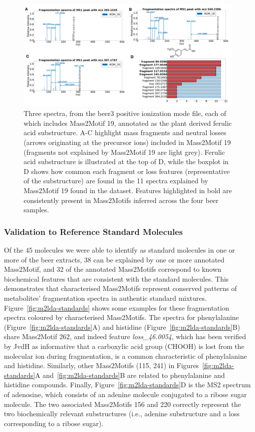 \begin{figure}[!htbp]
\centering\includegraphics[width=0.8\linewidth]{07-lda/figures/figure3.pdf}
\centering\caption[Three spectra, from the beer3 positive ionization mode file, each of which includes Mass2Motif 19, annotated as the plant derived ferulic acid substructure.]{Three spectra, from the beer3 positive ionization mode file, each of which includes Mass2Motif 19, annotated as the plant derived ferulic acid substructure. A-C highlight mass fragments and neutral losses (arrows originating at the precursor ions) included in Mass2Motif 19 (fragments not explained by Mass2Motif 19 are light grey). Ferulic acid substructure is illustrated at the top of D, while the boxplot in D shows how common each fragment or loss features (representative of the substructure) are found in the 11 spectra explained by Mass2Motif 19 found in the dataset. Features highlighted in bold are consistently present in Mass2Motifs inferred across the four beer samples.\label{fig:m2lda-ferulic-acid}}
\end{figure}

\subsubsection{Validation to Reference Standard Molecules}

Of the 45 molecules we were able to identify as standard molecules in one or more of the beer extracts, 38 can be explained by one or more annotated Mass2Motif, and 32 of the annotated Mass2Motifs correspond to known biochemical features that are consistent with the standard molecules. This demonstrates that characterised Mass2Motifs represent conserved patterns of metabolites' fragmentation spectra in authentic standard mixtures. Figure~\ref{fig:m2lda-standards} shows some examples for these fragmentation spectra coloured by characterised Mass2Motifs. The spectra for phenylalanine (Figure~\ref{fig:m2lda-standards}A) and histidine (Figure~\ref{fig:m2lda-standards}B) share Mass2Motif 262, and indeed feature \textit{loss\_46.0054}, which has been verified by JvdH as informative that a carboxylic acid group (CHOOH) is lost from the molecular ion during fragmentation, is a common characteristic of phenylalanine and histidine. Similarly, other Mass2Motifs (115, 241) in Figures~\ref{fig:m2lda-standards}A and~\ref{fig:m2lda-standards}B are related to phenylalanine and histidine compounds. Finally, Figure~\ref{fig:m2lda-standards}D is the MS2 spectrum of adenosine, which consists of an adenine molecule conjugated to a ribose sugar molecule. The two associated Mass2Motifs 156 and 220 correctly represent the two biochemically relevant substructures (i.e., adenine substructure and a loss corresponding to a ribose sugar). 

